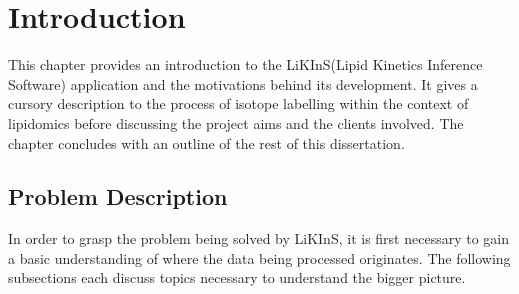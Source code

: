 \documentclass{l4proj}
\begin{document}
%
%
%
%
%
%
%
%
\chapter{Introduction}



This chapter provides an introduction to the LiKInS(Lipid Kinetics Inference Software) application and the motivations behind its development. It gives a cursory description to the process of isotope labelling within the context of lipidomics before discussing the project aims and the clients involved. The chapter concludes with an outline of the rest of this dissertation.

\section{Problem Description} \label{problem-description}
In order to grasp the problem being solved by LiKInS, it is first necessary to gain a basic understanding of where the data being processed originates. The following subsections each discuss topics necessary to understand the bigger picture.
\end{document}
